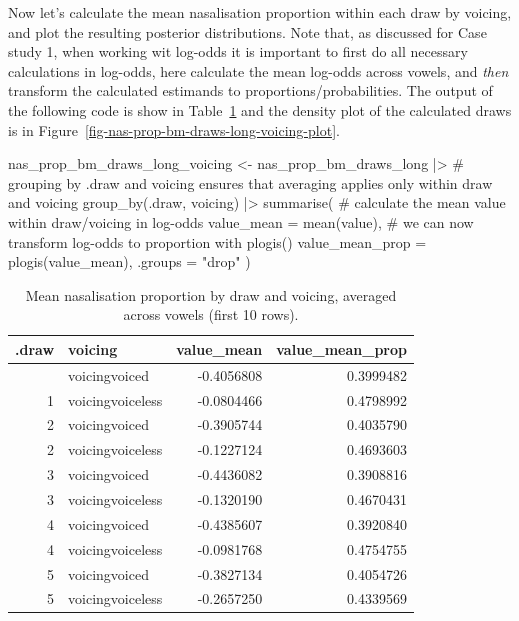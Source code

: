\documentclass[
  authoryear,
  preprint,
  3p]{elsarticle}
\newenvironment{Shaded}{\begin{snugshade}}{\end{snugshade}}
\newcommand{\AttributeTok}[1]{\textcolor[rgb]{0.40,0.45,0.13}{#1}}
\newcommand{\CommentTok}[1]{\textcolor[rgb]{0.37,0.37,0.37}{#1}}
\newcommand{\FunctionTok}[1]{\textcolor[rgb]{0.28,0.35,0.67}{#1}}
\newcommand{\NormalTok}[1]{\textcolor[rgb]{0.00,0.23,0.31}{#1}}
\newcommand{\OtherTok}[1]{\textcolor[rgb]{0.00,0.23,0.31}{#1}}
\newcommand{\SpecialCharTok}[1]{\textcolor[rgb]{0.37,0.37,0.37}{#1}}
\newcommand{\StringTok}[1]{\textcolor[rgb]{0.13,0.47,0.30}{#1}}
\begin{document}
Now let's calculate the mean nasalisation proportion within each draw by
voicing, and plot the resulting posterior distributions. Note that, as
discussed for Case study 1, when working wit log-odds it is important to
first do all necessary calculations in log-odds, here calculate the mean
log-odds across vowels, and \emph{then} transform the calculated
estimands to proportions/probabilities. The output of the following code
is show in Table~\ref{tbl-nas-long-voi} and the density plot of the
calculated draws is in
Figure~\ref{fig-nas-prop-bm-draws-long-voicing-plot}.

\begin{Shaded}
\begin{Highlighting}[]
\NormalTok{nas\_prop\_bm\_draws\_long\_voicing }\OtherTok{\textless{}{-}}\NormalTok{ nas\_prop\_bm\_draws\_long }\SpecialCharTok{|\textgreater{}} 
  \CommentTok{\# grouping by .draw and voicing ensures that averaging applies only within draw and voicing}
  \FunctionTok{group\_by}\NormalTok{(.draw, voicing) }\SpecialCharTok{|\textgreater{}} 
  \FunctionTok{summarise}\NormalTok{(}
    \CommentTok{\# calculate the mean value within draw/voicing in log{-}odds}
    \AttributeTok{value\_mean =} \FunctionTok{mean}\NormalTok{(value),}
    \CommentTok{\# we can now transform log{-}odds to proportion with plogis()}
    \AttributeTok{value\_mean\_prop =} \FunctionTok{plogis}\NormalTok{(value\_mean),}
    \AttributeTok{.groups =} \StringTok{"drop"}
\NormalTok{  )}
\end{Highlighting}
\end{Shaded}

\begin{longtable}[]{@{}rlrr@{}}

\caption{\label{tbl-nas-long-voi}Mean nasalisation proportion by draw
and voicing, averaged across vowels (first 10 rows).}

\tabularnewline

\toprule\noalign{}
.draw & voicing & value\_mean & value\_mean\_prop \\
\midrule\noalign{}
\endhead
\bottomrule\noalign{}
\endlastfoot
1 & voicingvoiced & -0.4056808 & 0.3999482 \\
1 & voicingvoiceless & -0.0804466 & 0.4798992 \\
2 & voicingvoiced & -0.3905744 & 0.4035790 \\
2 & voicingvoiceless & -0.1227124 & 0.4693603 \\
3 & voicingvoiced & -0.4436082 & 0.3908816 \\
3 & voicingvoiceless & -0.1320190 & 0.4670431 \\
4 & voicingvoiced & -0.4385607 & 0.3920840 \\
4 & voicingvoiceless & -0.0981768 & 0.4754755 \\
5 & voicingvoiced & -0.3827134 & 0.4054726 \\
5 & voicingvoiceless & -0.2657250 & 0.4339569 \\

\end{longtable}
\end{document}
